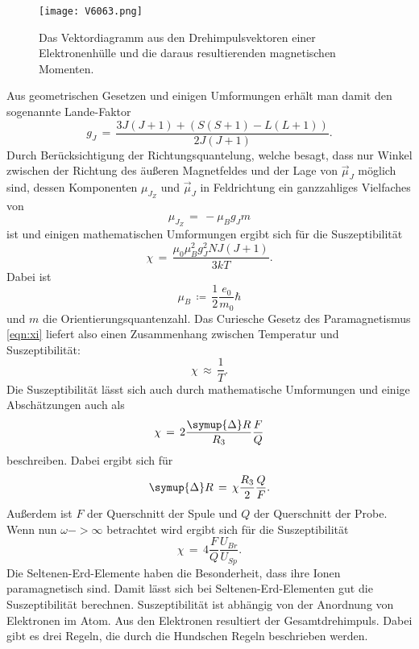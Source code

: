 \documentclass[
  bibliography=totoc,     %
  captions=tableheading,  %
  titlepage=firstiscover, %
]{scrartcl}
\begin{document}
\begin{figure}[H]
  \centering
  \texttt{[image: V6063.png]}
  \caption{Das Vektordiagramm aus den Drehimpulsvektoren einer Elektronenhülle
  und die daraus resultierenden magnetischen Momenten. \cite{anleitung}}
  \label{fig:V6061}
\end{figure}
\noindent
Aus geometrischen Gesetzen und einigen Umformungen erhält man damit den
sogenannte Lande-Faktor
\begin{equation}
  g_J\,=\, \frac{3J(J+1)+ (S(S+1)-L(L+1))}{2J(J+1)}.
  \label{eqn:g_j}
\end{equation}
Durch Berücksichtigung der Richtungsquantelung, welche besagt, dass nur Winkel
zwischen der Richtung des äußeren Magnetfeldes und der Lage von $\vec{\mu}_J$
möglich sind, dessen Komponenten $\mu_{J_Z}$ und $\vec{\mu}_J$ in Feldrichtung
ein ganzzahliges Vielfaches von
\begin{equation}
  \mu_{J_Z} \,=\,- \mu_B g_J m
  \label{eqn:mu}
\end{equation}
ist und einigen mathematischen Umformungen ergibt sich für die Suszeptibilität
\begin{equation}
  \chi \,=\, \frac{\mu_0 \mu_B^2 g_J^2 NJ(J+1)}{3kT}.
  \label{eqn:xi}
\end{equation}
Dabei ist
\begin{equation}
  \mu_B\,\coloneq\,\frac{1}{2} \frac{e_0}{m_0} \hbar
  \label{eqn:bohrmag}
\end{equation}
und $m$ die Orientierungsquantenzahl.
Das Curiesche Gesetz des Paramagnetismus \eqref{eqn:xi} liefert also einen
Zusammenhang zwischen Temperatur und Suszeptibilität:
\begin{equation}
  \chi\,\approx\,\frac{1}{T}.
\end{equation}
Die Suszeptibilität lässt sich auch durch mathematische Umformungen und einige
Abschätzungen auch als
\begin{equation}
  \chi\,=\,2\frac{\symup{\Delta}R}{R_3} \frac{F}{Q}
  \label{eqn:xi2}
\end{equation}
beschreiben. Dabei ergibt sich für
\begin{equation*}
  \symup{\Delta}R\,=\,\chi \frac{R_3}{2} \frac{Q}{F}.
\end{equation*}
Außerdem ist $F$ der Querschnitt der Spule und $Q$ der Querschnitt der Probe.
Wenn nun $\omega -> \infty$ betrachtet wird  ergibt sich für die Suszeptibilität
\begin{equation}
  \chi\,=\,4 \frac{F}{Q} \frac{U_{Br}}{U_{Sp}}.
  \label{eqn:infty}
\end{equation}
Die Seltenen-Erd-Elemente haben die Besonderheit, dass ihre Ionen
paramagnetisch sind. Damit lässt sich bei Seltenen-Erd-Elementen gut
die Suszeptibilität berechnen. Suszeptibilität ist abhängig von der
Anordnung von Elektronen im Atom. Aus den Elektronen resultiert der
Gesamtdrehimpuls. Dabei gibt es drei Regeln, die durch die Hundschen
Regeln beschrieben werden.
\end{document}
